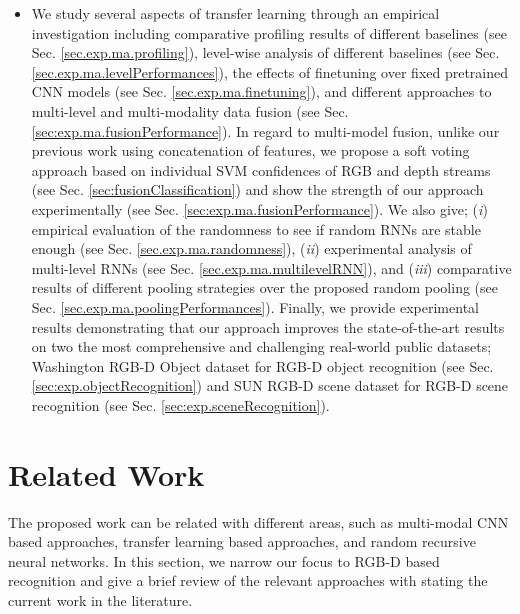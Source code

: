 \documentclass[10pt,journal,compsoc]{IEEEtran}
\begin{document}
\begin{itemize}
	
	\item We study several aspects of transfer learning through an empirical investigation including comparative profiling results of different baselines (see Sec. \ref{sec.exp.ma.profiling}), level-wise analysis of different baselines (see Sec. \ref{sec.exp.ma.levelPerformances}), the effects of finetuning over fixed pretrained CNN models (see Sec. \ref{sec.exp.ma.finetuning}), and different approaches to multi-level and multi-modality data fusion (see Sec. \ref{sec:exp.ma.fusionPerformance}). In regard to multi-model fusion, unlike our previous work using concatenation of features, we propose a soft voting approach based on individual SVM confidences of RGB and depth streams (see Sec. \ref{sec:fusionClassification}) and show the strength of our approach experimentally (see Sec. \ref{sec:exp.ma.fusionPerformance}). We also give; (\textit{i}) empirical evaluation of the randomness to see if random RNNs are stable enough (see Sec. \ref{sec.exp.ma.randomness}), (\textit{ii}) experimental analysis of multi-level RNNs (see Sec. \ref{sec.exp.ma.multilevelRNN}), and (\textit{iii}) comparative results of different pooling strategies over the proposed random pooling (see Sec. \ref{sec.exp.ma.poolingPerformances}). Finally, we provide experimental results demonstrating that our approach improves the state-of-the-art results on two the most comprehensive and challenging real-world public datasets; Washington RGB-D Object dataset for RGB-D object recognition (see Sec. \ref{sec:exp.objectRecognition}) and SUN RGB-D scene dataset for RGB-D scene recognition (see Sec. \ref{sec:exp.sceneRecognition}).
\end{itemize} 


\section{Related Work}
\label{sec:relatedwork}
The proposed work can be related with different areas, such as multi-modal CNN based approaches, transfer learning based approaches, and random recursive neural networks. In this section, we narrow our focus to RGB-D based recognition and give a brief review of the relevant approaches with stating the current work in the literature.
\end{document}
